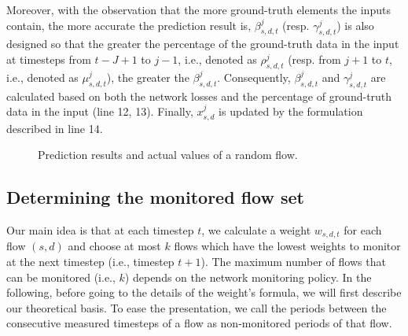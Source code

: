 Moreover, with the observation that the more ground-truth elements the inputs contain, the more accurate the prediction result is, $\beta^j_{s,d,t}$ (resp. $\gamma^j_{s,d,t}$) is also designed so that the greater the percentage of the ground-truth data in the input at timesteps from $t - J + 1$ to $j - 1$, i.e., denoted as $\rho^j_{s,d,t}$ (resp. from $j + 1$ to $t$, i.e., denoted as $\mu^j_{s,d,t}$), the greater the $\beta^j_{s,d,t}$. Consequently, $\beta^j_{s,d,t}$ and $\gamma^j_{s,d,t}$ are calculated based on both the network losses and the percentage of ground-truth data in the input (line 12, 13). Finally, $x^j_{s,d}$ is updated by the formulation described in line 14.
\begin{figure}
\centering
    \hfill
      \hfill
    \vspace{-10pt}
	\caption{Prediction results and actual values of a random flow.} 
    \label{fig:prediction_result}
\end{figure}
\subsection{Determining the monitored flow set}
\label{subsection:flows_selection}
Our main idea is that at each timestep $t$, we calculate a weight $w_{s,d,t}$ for each flow $(s, d)$ and choose at most $k$ flows which have the lowest weights to monitor at the next timestep (i.e., timestep $t+1$). The maximum number of flows that can be monitored (i.e., $k$) depends on the network monitoring policy. In the following, before going to the details of the weight's formula, we will first describe our theoretical basis. To ease the presentation, we call the periods between the consecutive measured timesteps of a flow as non-monitored periods of that flow.

